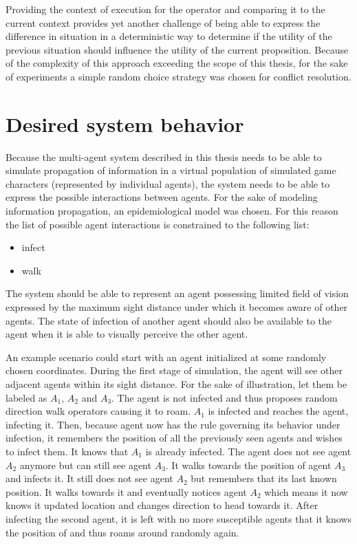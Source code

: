Providing the context of execution for the operator and comparing it to the current context provides yet another challenge of being able to express the difference in situation in a deterministic way to determine if the utility of the previous situation should influence the utility of the current proposition.
Because of the complexity of this approach exceeding the scope of this thesis, for the sake of experiments a simple random choice strategy was chosen for conflict resolution.

\section{Desired system behavior}

Because the multi-agent system described in this thesis needs to be able to simulate propagation of information in a virtual population of simulated game characters (represented by individual agents), the system needs to be able to express the possible interactions between agents.
For the sake of modeling information propagation, an epidemiological model was chosen.
For this reason the list of possible agent interactions is constrained to the following list:

\begin{itemize}
    \item infect
    \item walk
\end{itemize}

The system should be able to represent an agent possessing limited field of vision expressed by the maximum sight distance under which it becomes aware of other agents.
The state of infection of another agent should also be available to the agent when it is able to visually perceive the other agent.

An example scenario could start with an agent initialized at some randomly chosen coordinates.
During the first stage of simulation, the agent will see other adjacent agents within its sight distance.
For the sake of illustration, let them be labeled as $A_1$, $A_2$ and $A_3$.
The agent is not infected and thus proposes random direction walk operators causing it to roam.
$A_1$ is infected and reaches the agent, infecting it.
Then, because agent now has the rule governing its behavior under infection, it remembers the position of all the previously seen agents and wishes to infect them.
It knows that $A_1$ is already infected.
The agent does not see agent $A_2$ anymore but can still see agent $A_3$.
It walks towards the position of agent $A_3$ and infects it.
It still does not see agent $A_2$ but remembers that its last known position.
It walks towards it and eventually notices agent $A_2$ which means it now knows it updated location and changes direction to head towards it.
After infecting the second agent, it is left with no more susceptible agents that it knows the position of and thus roams around randomly again.

